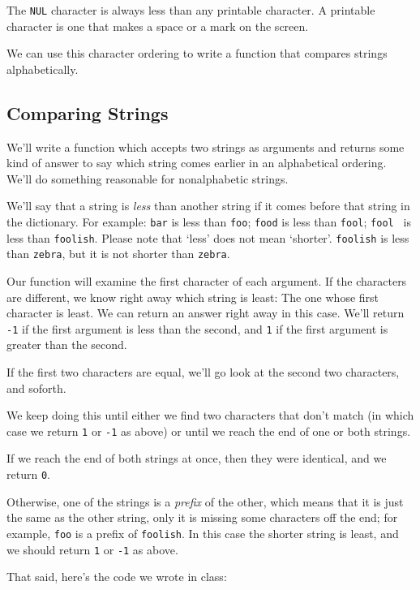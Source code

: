 The {\tt NUL} character is always less than any printable character.  A
printable character is one that makes a space or a mark on the screen.

We can use this character ordering to write a function that compares
strings alphabetically. 

\subsection{Comparing Strings}

We'll write a function which accepts two strings as arguments and
returns some kind of answer to say which string comes earlier in an
alphabetical ordering.  We'll do something reasonable for nonalphabetic
strings.  

    We'll say that a string is {\em less}\/ than another string if it
comes before that string in the dictionary.  For example: {\tt bar} is
less than {\tt foo}; {\tt food} is less than {\tt fool}; {\tt fool } is
less than {\tt foolish}.  Please note that `less' does not mean
`shorter'.  {\tt foolish} is less than {\tt zebra}, but it is not
shorter than {\tt zebra}.

    Our function will examine the first character of each argument.  If
the characters are different, we know right away which string is least:
The one whose first character is least.  We can return an answer right
away in this case.  We'll return {\tt -1} if the first argument is less
than the second, and {\tt 1} if the first argument is greater than the
second.

    If the first two characters are equal, we'll go look at the second
two characters, and soforth.

    We keep doing this until either we find two characters that don't
match (in which case we return {\tt 1} or {\tt -1} as above) or until we
reach the end of one or both strings.

    If we reach the end of both strings at once, then they were
identical, and we return {\tt 0}. 

    Otherwise, one of the strings is a {\em prefix}\/ of the other,
which means that it is just the same as the other string, only it is
missing some characters off the end; for example, {\tt foo} is a prefix
of {\tt foolish}.  In this case the shorter string is least, and we
should return {\tt 1} or {\tt -1} as above.

That said, here's the code we wrote in class:



